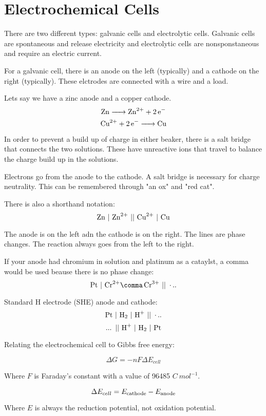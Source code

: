 \documentclass{article}
\begin{document}
\section{Electrochemical Cells}

There are two different types: galvanic cells and electrolytic cells. Galvanic
cells are spontaneous and release electricity and electrolytic cells are
nonsponstaneous and require an electric current.

For a galvanic cell, there is an anode on the left (typically) and a cathode on
the right (typically). These elctrodes are connected with a wire and a load.

Lets say we have a zinc anode and a copper cathode.
$$\ce{Zn -> Zn^{2+} + 2e-}$$
$$\ce{Cu^{2+} + 2e- -> Cu}$$

In order to prevent a build up of charge in either beaker, there is a salt
bridge that connects the two solutions. These have unreactive ions that travel
to balance the charge build up in the solutions.

Electrons go from the anode to the cathode. A salt bridge is necessary for
charge neutrality. This can be remembered through "an ox" and "red cat".

There is also a shorthand notation:
$$\ce{Zn\ \vert\ Zn^{2+}\ \vert\vert\ Cu^{2+}\ \vert\ Cu}$$

The anode is on the left adn the cathode is on the right. The lines are phase
changes. The reaction always goes from the left to the right.

If your anode had chromium in solution and platinum as a cataylst, a comma would
be used beause there is no phase change:
$$\ce{Pt\ \vert\ Cr^{2+}\comma Cr^{3+}\ \vert\vert\ ...}$$

Standard H electrode (SHE) anode and cathode:
$$\ce{Pt\ \vert\ H_2\ \vert\ H+\ \vert\vert\ ...}$$
$$\ce{...\ \vert\vert\ H+\ \vert\ H_2\ \vert\ Pt}$$

Relating the electrochemical cell to Gibbs free energy:

$$\Delta G = -n F \Delta E_{cell}$$

Where $F$ is Faraday's constant with a value of 96485 $\si{C\ mol^{-1}}$.

$$\Delta E_{cell} = E_{\rm{cathode}} - E_{\rm{anode}}$$

Where $E$ is always the reduction potential, not oxidation potential.
\end{document}
